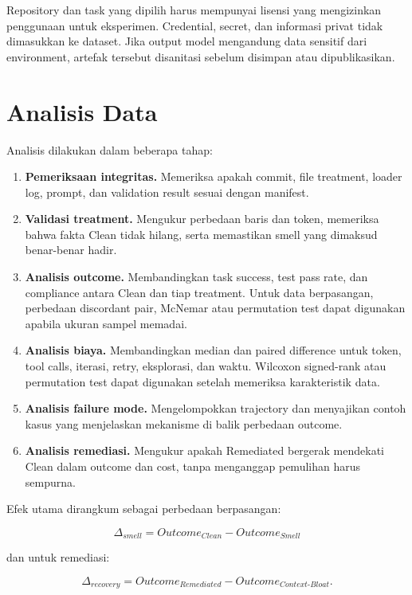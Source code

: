 Repository dan task yang dipilih harus mempunyai lisensi yang mengizinkan penggunaan untuk eksperimen. Credential, secret, dan informasi privat tidak dimasukkan ke dataset. Jika output model mengandung data sensitif dari environment, artefak tersebut disanitasi sebelum disimpan atau dipublikasikan.

\section{Analisis Data}

Analisis dilakukan dalam beberapa tahap:

\begin{enumerate}[leftmargin=*]
    \item \textbf{Pemeriksaan integritas.} Memeriksa apakah commit, file treatment, loader log, prompt, dan validation result sesuai dengan manifest.
    \item \textbf{Validasi treatment.} Mengukur perbedaan baris dan token, memeriksa bahwa fakta Clean tidak hilang, serta memastikan smell yang dimaksud benar-benar hadir.
    \item \textbf{Analisis outcome.} Membandingkan task success, test pass rate, dan compliance antara Clean dan tiap treatment. Untuk data berpasangan, perbedaan discordant pair, McNemar atau permutation test dapat digunakan apabila ukuran sampel memadai.
    \item \textbf{Analisis biaya.} Membandingkan median dan paired difference untuk token, tool calls, iterasi, retry, eksplorasi, dan waktu. Wilcoxon signed-rank atau permutation test dapat digunakan setelah memeriksa karakteristik data.
    \item \textbf{Analisis failure mode.} Mengelompokkan trajectory dan menyajikan contoh kasus yang menjelaskan mekanisme di balik perbedaan outcome.
    \item \textbf{Analisis remediasi.} Mengukur apakah Remediated bergerak mendekati Clean dalam outcome dan cost, tanpa menganggap pemulihan harus sempurna.
\end{enumerate}

Efek utama dirangkum sebagai perbedaan berpasangan:

\begin{equation}
\Delta_{smell} = Outcome_{Clean} - Outcome_{Smell}
\end{equation}

dan untuk remediasi:

\begin{equation}
\Delta_{recovery} = Outcome_{Remediated} - Outcome_{Context\text{-}Bloat}.
\end{equation}


